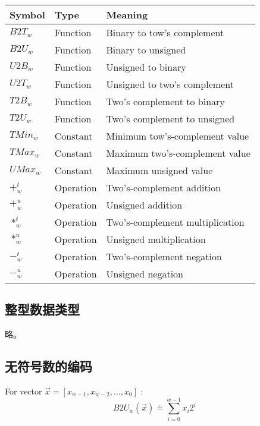 \begin{table}[!ht]
    \centering
    \begin{tabular}{lll}
        \toprule
        Symbol & Type & Meaning \\
        \midrule
        $B2T_w$  & Function  & Binary to tow's complement \\
        $B2U_w$  & Function  & Binary to unsigned \\
        $U2B_w$  & Function  & Unsigned to binary \\
        $U2T_w$  & Function  & Unsigned to two's complement \\
        $T2B_w$  & Function  & Two's complement to binary \\
        $T2U_w$  & Function  & Two's complement to unsigned \\
        $TMin_w$ & Constant  & Minimum tow's-complement value \\
        $TMax_w$ & Constant  & Maximum two's-complement value \\
        $UMax_w$ & Constant  & Maximum unsigned value \\
        $+^t_w$  & Operation & Two's-complement addition \\
        $+^u_w$  & Operation & Unsigned addition \\
        $*^t_w$  & Operation & Two's-complement multiplication \\
        $*^u_w$  & Operation & Unsigned multiplication \\
        $-^t_w$  & Operation & Two's-complement negation \\
        $-^u_w$  & Operation & Unsigned negation \\
        \bottomrule
    \end{tabular}
\end{table}

\subsection{整型数据类型}

略。

\subsection{无符号数的编码}

\begin{definition}
    For vector $\vec{x} = [x_{w-1}, x_{w-2}, \dots, x_0]$ :
    \begin{equation}
        B2U_w(\vec{x}) \doteq \sum\limits_{i=0}^{w-1} x_i 2^i
        \label{def:b2u}
    \end{equation}
\end{definition}

